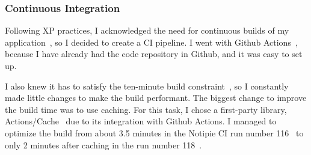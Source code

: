 \subsubsection{Continuous Integration}\label{sec:continuous-integration}

Following \ac{XP} practices,
I acknowledged the need for
continuous builds of my application~\cite[pp.~49-50]{beck_extreme_2004},
so I decided to create a \ac{CI} pipeline.
I went with Github Actions~\cite{github_inc_github_2022-1},
because I have already had
the code repository in Github,
and it was easy to set up.

I also knew it has to satisfy
the ten-minute build constraint~\cite[p.~49]{beck_extreme_2004},
so I constantly made little changes
to make the build performant.
The biggest change to improve
the build time was to use caching.
For this task, I chose a first-party library,
Actions/Cache~\cite{sharma_actionscache_2022}
due to its integration with Github Actions.
I managed to optimize the build
from about 3.5 minutes
in the Notipie \ac{CI} run number 116~
to only 2 minutes after caching
in the run number 118~.

